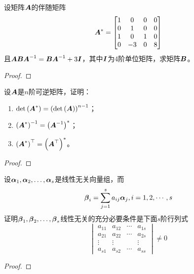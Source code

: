 \begin{problem}
设矩阵\(\boldsymbol{A}\)的伴随矩阵
\begin{equation*}
    \boldsymbol{A}^*=
    \begin{bmatrix}
        1 & 0  & 0 & 0 \\
        0 & 1  & 0 & 0 \\
        1 & 0  & 1 & 0 \\
        0 & -3 & 0 & 8
    \end{bmatrix}
\end{equation*}
且\(\boldsymbol{A}\boldsymbol{B}{\boldsymbol{A}}^{-1}=\boldsymbol{B}{\boldsymbol{A}}^{-1}+3\boldsymbol{I}\)，其中\(\boldsymbol{I}\)为\(4\)阶单位矩阵，求矩阵\(\boldsymbol{B}\)。
\end{problem}
\begin{proof}
\end{proof}

\begin{problem}
设\(\boldsymbol{A}\)是\(n\)阶可逆矩阵，证明：
\begin{enumerate}
    \item \(\mathrm{det}\left( \boldsymbol{A}^* \right)=\left( \mathrm{det}\left( \boldsymbol{A} \right) \right)^{n-1}\)；
    \item \({\left( \boldsymbol{A}^* \right)}^{-1}=\left( {\boldsymbol{A}}^{-1} \right)^*\)；
    \item \(\left( \boldsymbol{A}^* \right)^\top=\left( \boldsymbol{A}^\top \right)^*\)。
\end{enumerate}
\end{problem}
\begin{proof}
\end{proof}

\begin{problem}
设\({\boldsymbol{\alpha}}_1,{\boldsymbol{\alpha}}_2,\dots,{\boldsymbol{\alpha}}_{s}\)是线性无关向量组，而
\begin{equation*}
    \boldsymbol{\beta}_i=\sum_{j=1}^sa_{ij}\boldsymbol{\alpha}_j,i=1,2,\cdots,s
\end{equation*}
证明\({\boldsymbol{\beta}}_1,{\boldsymbol{\beta}}_2,\dots,{\boldsymbol{\beta}}_{s}\)线性无关的充分必要条件是下面\(s\)阶行列式
\begin{equation*}
    \begin{vmatrix}
        a_{11} & a_{12} & \cdots & a_{1s} \\
        a_{21} & a_{22} & \cdots & a_{2s} \\
        \vdots & \vdots &        & \vdots \\
        a_{s1} & a_{s2} & \cdots & a_{ss}
    \end{vmatrix}\neq0
\end{equation*}
\end{problem}
\begin{proof}
\end{proof}

